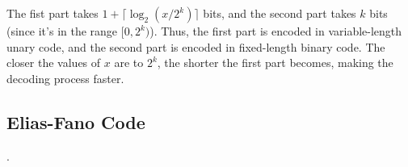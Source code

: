 \noindent The fist part takes $1 + \lceil\log_2(x/2^k)\rceil$ bits, and the second part takes $k$ bits (since it's in the range $[0,2^k)$). Thus, the first part is encoded in variable-length unary code, and the second part is encoded in fixed-length binary code. The closer the values of $x$ are to $2^k$, the shorter the first part becomes, making the decoding process faster.

\subsection{Elias-Fano Code}

.

